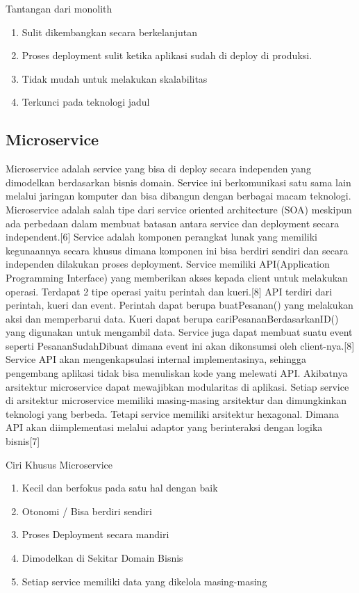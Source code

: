 Tantangan dari monolith	
\begin{enumerate}[leftmargin=1.3cm]
	\item Sulit dikembangkan secara berkelanjutan
	\item Proses deployment sulit ketika aplikasi sudah di deploy di produksi.
	\item Tidak mudah untuk melakukan skalabilitas
	\item Terkunci pada teknologi jadul\\
\end{enumerate}	

\subsection{Microservice}
Microservice adalah service yang bisa di deploy secara independen yang dimodelkan berdasarkan bisnis domain. Service ini berkomunikasi satu sama lain melalui jaringan komputer dan bisa dibangun dengan berbagai macam teknologi.  Microservice adalah salah tipe dari service oriented architecture (SOA) meskipun ada perbedaan dalam membuat batasan antara service dan deployment  secara independent.[6]
Service adalah komponen perangkat lunak yang memiliki kegunaannya secara khusus dimana komponen ini bisa berdiri sendiri dan secara independen dilakukan proses deployment. Service memiliki API(Application Programming Interface) yang memberikan akses kepada client untuk melakukan operasi. Terdapat 2 tipe operasi yaitu perintah dan kueri.[8]
API terdiri dari perintah, kueri dan event. Perintah dapat berupa buatPesanan() yang melakukan aksi dan memperbarui data. Kueri dapat berupa cariPesananBerdasarkanID() yang digunakan untuk mengambil data. Service juga dapat membuat suatu event seperti PesananSudahDibuat dimana event ini akan dikonsumsi oleh client-nya.[8]
Service API akan mengenkapsulasi internal implementasinya, sehingga pengembang aplikasi tidak bisa menuliskan kode yang melewati API. Akibatnya arsitektur microservice dapat mewajibkan modularitas di aplikasi.  Setiap service di arsitektur microservice memiliki masing-masing arsitektur dan dimungkinkan teknologi  yang berbeda. Tetapi service memiliki arsitektur hexagonal. Dimana API akan diimplementasi melalui adaptor yang berinteraksi dengan logika bisnis[7]

Ciri Khusus Microservice	
\begin{enumerate}[leftmargin=1.3cm]
	\item Kecil dan berfokus pada satu hal dengan baik
	\item Otonomi / Bisa berdiri sendiri
	\item Proses Deployment  secara mandiri
	\item Dimodelkan di Sekitar Domain Bisnis
	\item Setiap service memiliki data yang dikelola masing-masing
\end{enumerate}	


